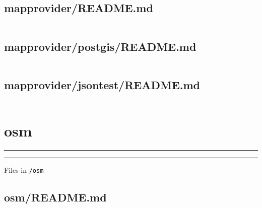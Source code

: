 \documentclass[../main.tex]{subfiles}
\begin{document}
\subsection{mapprovider/README.md}\label{lst:mapprovider-readme-md}
\inputminted[breaklines=true]{text}{parts/code/mapprovider/README.md}

\subsection{mapprovider/postgis/README.md}\label{lst:mapprovider-postgis-readme-md}
\inputminted[breaklines=true]{text}{parts/code/mapprovider/postgis/README.md}

\subsection{mapprovider/jsontest/README.md}\label{lst:mapprovider-jsontest-readme-md}
\inputminted[breaklines=true]{text}{parts/code/mapprovider/jsontest/README.md}

\section{osm}
\begin{mylisting}
\hrule
\vspace{0.5em}
\vspace{0.5em}
\hrule
\vspace{0.5em}
\caption{Files in \texttt{/osm}}
\label{lst:dir-osm}
\end{mylisting}

\subsection{osm/README.md}\label{lst:osm-readme-md}
\inputminted[breaklines=true]{text}{parts/code/osm/README.md}
\end{document}

